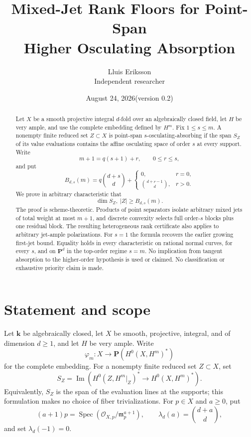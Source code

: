 \documentclass[11pt]{article}
\title{Mixed-Jet Rank Floors for Point-Span\\Higher Osculating Absorption}
\author{Lluis Eriksson\\\small Independent researcher}
\date{August 24, 2026\quad (version 0.2)}
\theoremstyle{definition}
\theoremstyle{remark}
\theoremstyle{plain}
\newcommand{\PP}{\mathbf P}
\newcommand{\kk}{\mathbf k}
\newcommand{\cO}{\mathcal O}
\begin{document}
\maketitle

\begin{abstract}
Let $X$ be a smooth projective integral $d$-fold over an algebraically
closed field, let $H$ be very ample, and use the complete embedding defined
by $H^m$.  Fix $1\leq s\leq m$.  A nonempty finite reduced set
$Z\subset X$ is point-span $s$-osculating-absorbing if the span $S_Z$ of
its value evaluations contains the affine osculating space of order $s$ at
every support.  Write
\[
 m+1=q(s+1)+r,\qquad 0\leq r\leq s,
\]
and put
\[
 B_{d,s}(m)=q\binom{d+s}{d}
 +\begin{cases}0,&r=0,\\ \binom{d+r-1}{d},&r>0.\end{cases}
\]
We prove in arbitrary characteristic that
\[
 \dim S_Z,\ |Z|\geq B_{d,s}(m).
\]
The proof is scheme-theoretic.  Products of point separators isolate
arbitrary mixed jets of total weight at most $m+1$, and discrete convexity
selects full order-$s$ blocks plus one residual block.  The resulting
heterogeneous rank certificate also applies to arbitrary jet-ample
polarizations.  For $s=1$ the formula recovers the earlier growing first-jet
bound.  Equality holds in every characteristic on rational normal curves,
for every $s$, and on $\PP^d$ in the top-order regime $s=m$.  No implication
from tangent absorption to the higher-order hypothesis is used or claimed.
No classification or exhaustive priority claim is made.
\end{abstract}

\section{Statement and scope}

Let $\kk$ be algebraically closed, let $X$ be smooth, projective, integral,
and of dimension $d\geq1$, and let $H$ be very ample.  Write
\[
 \varphi_m:X\longrightarrow\PP(H^0(X,H^m)^*)
\]
for the complete embedding.  For a nonempty finite reduced set $Z\subset X$,
set
\[
 S_Z=\operatorname{Im}\!\left(
 H^0(Z,H^m|_Z)^*\longrightarrow H^0(X,H^m)^*\right).
\]
Equivalently, $S_Z$ is the span of the evaluation lines at the supports;
this formulation makes no choice of fiber trivializations.
For $p\in X$ and $a\geq0$, put
\[
 (a+1)p=\operatorname{Spec}(\cO_{X,p}/\mathfrak m_p^{a+1}),\qquad
 \lambda_d(a)=\binom{d+a}{d},
\]
and set $\lambda_d(-1)=0$.
\end{document}

